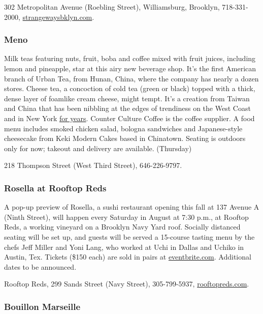 302 Metropolitan Avenue (Roebling Street), Williamsburg, Brooklyn,
718-331-2000, \href{http://strangewaysbklyn.com/}{strangewaysbklyn.com}.

\hypertarget{meno-}{%
\subsubsection{Meno }\label{meno-}}

Milk teas featuring nuts, fruit, boba and coffee mixed with fruit
juices, including lemon and pineapple, star at this airy new beverage
shop. It's the first American branch of Urban Tea, from Hunan, China,
where the company has nearly a dozen stores. Cheese tea, a concoction of
cold tea (green or black) topped with a thick, dense layer of foamlike
cream cheese, might tempt. It's a creation from Taiwan and China that
has been nibbling at the edges of trendiness on the West Coast and in
New York
\href{https://www.nytimes.com/2018/12/21/dining/food-trends-predictions-2019.html}{for
years}. Counter Culture Coffee is the coffee supplier. A food menu
includes smoked chicken salad, bologna sandwiches and Japanese-style
cheesecake from Keki Modern Cakes based in Chinatown. Seating is
outdoors only for now; takeout and delivery are available. (Thursday)

218 Thompson Street (West Third Street), 646-226-9797.

\hypertarget{rosella-at-rooftop-reds}{%
\subsubsection{Rosella at Rooftop Reds}\label{rosella-at-rooftop-reds}}

A pop-up preview of Rosella, a sushi restaurant opening this fall at 137
Avenue A (Ninth Street), will happen every Saturday in August at 7:30
p.m., at Rooftop Reds, a working vineyard on a Brooklyn Navy Yard roof.
Socially distanced seating will be set up, and guests will be served a
15-course tasting menu by the chefs Jeff Miller and Yoni Lang, who
worked at Uchi in Dallas and Uchiko in Austin, Tex. Tickets (\$150 each)
are sold in pairs at
\href{https://www.eventbrite.com/e/rosella-sushi-at-rooftop-reds-tickets-115418023415}{eventbrite.com}.
Additional dates to be announced.

Rooftop Reds, 299 Sands Street (Navy Street), 305-799-5937,
\href{http://www.rooftopreds.com/}{rooftopreds.com}.

\hypertarget{bouillon-marseille-}{%
\subsubsection{Bouillon Marseille }\label{bouillon-marseille-}}

